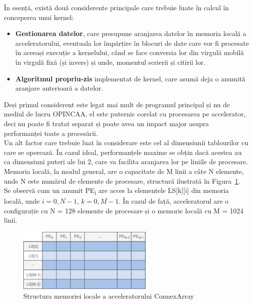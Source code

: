 În esență, există două considerente principale care trebuie luate în calcul în
conceperea unui kernel:
\begin{itemize}
  \item \textbf{Gestionarea datelor}, care presupune aranjarea datelor în
  memoria locală a acceleratorului, eventuala lor împărțire în blocuri de date
  care vor fi procesate în aceeași execuție a kernelului, când se face
  conversia lor din virgulă mobilă în virgulă fixă (și invers) și unde, momentul
  scrierii și citirii lor.

  \item \textbf{Algoritmul propriu-zis} implementat de kernel, care asumă deja
  o anumită aranjare anterioară a datelor.
\end{itemize}

Deși primul considerent este legat mai mult de programul principal și nu de
mediul de lucru OPINCAA, el este puternic corelat cu procesarea pe accelerator,
deci nu poate fi tratat separat și poate avea un impact major asupra
performanței toate a procesării.  \\

Un alt factor care trebuie luat în considerare este cel al dimensiunii
tablourilor cu care se operează. În cazul ideal, performanțele maxime se obțin
dacă acestea au ca dimensiuni puteri ale lui 2, care va facilita aranjarea lor
pe liniile de procesare. Memoria locală, la modul general, are o capacitate de M
linii a câte N elemente, unde N este numărul de elemente de procesare, structură
ilustrată în Figura~\ref{fig:local-storage-struct}. Se observă cum un anumit
PE\textsubscript{i} are acces la elementele LS[k][i] din memoria locală, unde $i
= \overline{0, N-1}$, $k = \overline{0, M-1}$. În cazul de față, acceleratorul
are o configurație cu N = 128 elemente de procesare și o memorie locală cu M = 1024
linii. \\

\begin{figure}[h]
    \centering
    \includegraphics[width=0.6\textwidth]{src/img/local-storage-struct}
    \caption{Structura memoriei locale a acceleratorului ConnexArray}
    \label{fig:local-storage-struct}
\end{figure}

